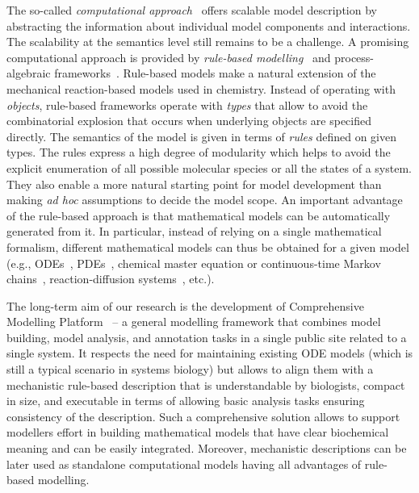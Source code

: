 \documentclass[11pt,a4paper]{report}
\begin{document}
The so-called \emph{computational approach}~\cite{Cardelli,Henzinger} offers scalable model description by abstracting the information about individual model components and interactions. The scalability at the semantics level still remains to be a challenge. A promising computational approach is provided by \emph{rule-based modelling}~\cite{kappa_formal,harris2016bionetgen} and process-algebraic frameworks~\cite{Cardelli,BioPEPA,BioSPI}. Rule-based models make a natural extension of the mechanical reaction-based models used in chemistry. Instead of operating with \emph{objects}, rule-based frameworks operate with \emph{types} that allow to avoid the combinatorial explosion that occurs when underlying objects are specified directly. The semantics of the model is given in terms of \emph{rules} defined on given types. The rules express a high degree of modularity which helps to avoid the explicit enumeration of all possible molecular species or all the states of a system. They also enable a more natural starting point for model development than making \emph{ad hoc} assumptions to decide the model scope. An important advantage of the rule-based approach is that mathematical models can be automatically generated from it. In particular, instead of relying on a single mathematical formalism, different mathematical models can thus be obtained for a given model (e.g., ODEs~\cite{camporesi2017k}, PDEs~\cite{andrews2016smoldyn}, chemical master equation or continuous-time Markov chains~\cite{pauleve2010generic,sneddon2011efficient}, reaction-diffusion systems~\cite{sorokina2013simulator}, etc.). 

The long-term aim of our research is the development of Comprehensive Modelling Platform~\cite{BCS,klement2013comprehensive} -- a general modelling framework that combines model building, model analysis, and annotation tasks in a single public site related to a single system. It respects the need for maintaining existing ODE models (which is still a typical scenario in systems biology) but allows to align them with a mechanistic rule-based description that is understandable by biologists, compact in size, and executable in terms of allowing basic analysis tasks ensuring consistency of the description. Such a comprehensive solution allows to support modellers effort in building mathematical models that have clear biochemical meaning and can be
easily integrated. Moreover, mechanistic descriptions can be later used as standalone computational models having all advantages of rule-based modelling. 
\end{document}
